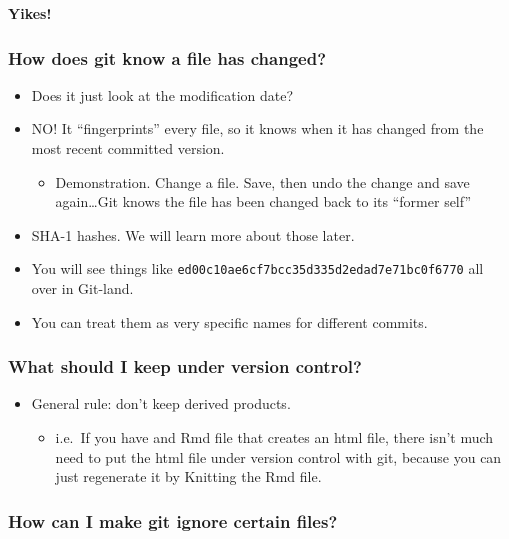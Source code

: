 \documentclass[]{book}
\providecommand{\tightlist}{%
  \setlength{\itemsep}{0pt}\setlength{\parskip}{0pt}}
\theoremstyle{definition}
\theoremstyle{definition}
\theoremstyle{remark}
\begin{document}
\textbf{Yikes!}

\subsubsection{How does git know a file has
changed?}\label{how-does-git-know-a-file-has-changed}

\begin{itemize}
\tightlist
\item
  Does it just look at the modification date?
\item
  NO! It ``fingerprints'' every file, so it knows when it has changed
  from the most recent committed version.

  \begin{itemize}
  \tightlist
  \item
    Demonstration. Change a file. Save, then undo the change and save
    again\ldots{}Git knows the file has been changed back to its
    ``former self''
  \end{itemize}
\item
  SHA-1 hashes. We will learn more about those later.\\
\item
  You will see things like
  \texttt{ed00c10ae6cf7bcc35d335d2edad7e71bc0f6770} all over in
  Git-land.
\item
  You can treat them as very specific names for different commits.
\end{itemize}

\subsubsection{What should I keep under version
control?}\label{what-should-i-keep-under-version-control}

\begin{itemize}
\tightlist
\item
  General rule: don't keep derived products.

  \begin{itemize}
  \tightlist
  \item
    i.e.~If you have and Rmd file that creates an html file, there isn't
    much need to put the html file under version control with git,
    because you can just regenerate it by Knitting the Rmd file.
  \end{itemize}
\end{itemize}

\subsubsection{How can I make git ignore certain
files?}\label{how-can-i-make-git-ignore-certain-files}
\end{document}
